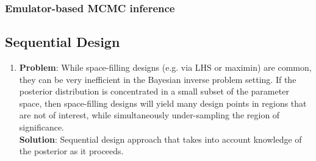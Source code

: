 \documentclass[12pt]{article}
\begin{document}
\subsubsection{Emulator-based MCMC inference}

\subsection{Sequential Design}
\begin{enumerate}
\item \textbf{Problem}: While space-filling designs (e.g. via LHS or maximin) are common, they can be very inefficient in the Bayesian inverse problem setting. If the posterior distribution is concentrated in a small 
subset of the parameter space, then space-filling designs will yield many design points in regions that are not of interest, while simultaneously under-sampling the region of significance.  \\
	\textbf{Solution}: Sequential design approach that takes into account knowledge of the posterior as it proceeds. 
\end{enumerate}
\end{document}

